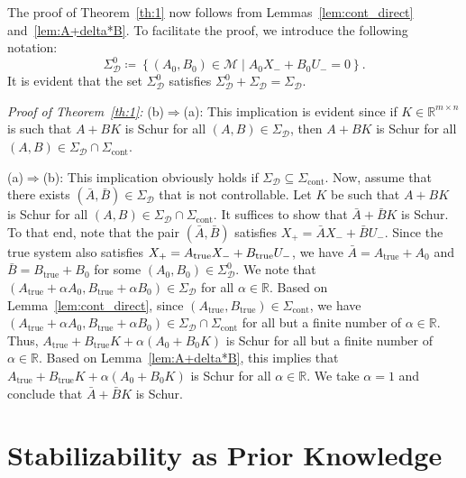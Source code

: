 \documentclass[9pt,shortpaper,twoside,web]{ieeecolor}
\newcommand{\set}[2]{\left\{#1 \mid #2\right\}}
\begin{document}
The proof of Theorem~\ref{th:1} now follows from Lemmas~\ref{lem:cont_direct} and~\ref{lem:A+delta*B}. To facilitate the proof, we introduce the following notation:
\begin{equation}
\Sigma_\mathcal{D}^0\coloneqq\set{(A_0,B_0)\in\mathcal{M}}{A_0X_-+B_0U_-=0}.
\end{equation}
It is evident that the set $\Sigma_\mathcal{D}^0$ satisfies $\Sigma_\mathcal{D}^0+\Sigma_\mathcal{D}=\Sigma_\mathcal{D}$.

\textit{Proof of Theorem~\ref{th:1}:} 
(b)$\Rightarrow$(a): This implication is evident since if $K\in\mathbb{R}^{m\times n}$ is such that $A+BK$ is Schur for all $(A,B)\in\Sigma_\mathcal{D}$, then $A+BK$ is Schur for all $(A,B)\in\Sigma_\mathcal{D}\cap\Sigma_\text{cont}$.  

(a)$\Rightarrow$(b): This implication obviously holds if $\Sigma_\mathcal{D}\subseteq\Sigma_\text{cont}$. Now, assume that there exists $(\bar{A},\bar{B})\in\Sigma_\mathcal{D}$ that is not controllable. Let $K$ be such that $A+BK$ is Schur for all $(A,B)\in\Sigma_\mathcal{D}\cap\Sigma_\text{cont}$. It suffices to show that $\bar{A}+\bar{B}K$ is Schur. To that end, note that the pair $(\bar{A},\bar{B})$ satisfies $X_+=\bar{A}X_-+\bar{B}U_-$. Since the true system also satisfies $X_+=A_\textup{true}X_-+B_\textup{true}U_-$, we have
$\bar{A}=A_\text{true}+A_0$ and $\bar{B}=B_\text{true}+B_0$
for some \mbox{$(A_0,B_0)\in\Sigma_\mathcal{D}^0$}. We note that \mbox{$(A_\text{true}+\alpha A_0,B_\text{true}+\alpha B_0)\in\Sigma_\mathcal{D}$} for all $\alpha\in\mathbb{R}$. Based on Lemma~\ref{lem:cont_direct}, since $(A_\text{true},B_\text{true})\in\Sigma_\text{cont}$, we have \linebreak $(A_\text{true}+\alpha A_0,B_\text{true}+\alpha B_0)\in\Sigma_\mathcal{D}\cap\Sigma_\text{cont}$ for all but a finite number of $\alpha \in \mathbb{R}$. Thus, $A_\text{true}+B_\text{true}K+\alpha(A_0+B_0 K)$ is Schur for all but a finite number of $\alpha \in \mathbb{R}$. Based on Lemma~\ref{lem:A+delta*B}, this implies that $A_\text{true}+B_\text{true}K+\alpha(A_0+B_0 K)$ is Schur for all $\alpha\in\mathbb{R}$. We take $\alpha=1$ and conclude that $\bar{A}+\bar{B}K$ is Schur. \hfill \QED



\section{Stabilizability as Prior Knowledge}
\label{sec:IV}
\end{document}
